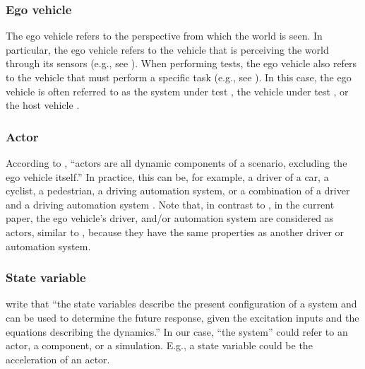 \subsubsection{Ego vehicle}
\label{sec:ego vehicle}
The ego vehicle refers to the perspective from which the world is seen. In particular, the ego vehicle refers to the vehicle that is perceiving the world through its sensors (e.g., see \autocite{Bonnin2014}). When performing tests, the ego vehicle also refers to the vehicle that must perform a specific task (e.g., see \autocite{althoff2017CommonRoad}). In this case, the ego vehicle is often referred to as the system under test \autocite{stellet2015taxonomy}, the vehicle under test \autocite{gietelink2006development}, or the host vehicle \autocite{gietelink2006development}.

\subsubsection{Actor}
\label{sec:actor}

According to \textcite{catapult2018musicc}, ``actors are all dynamic components of a scenario, excluding the ego vehicle itself.'' In practice, this can be, for example, a driver of a car, a cyclist, a pedestrian, a driving automation system, or a combination of a driver and a driving automation system \autocite{geyer2014}. Note that, in contrast to \autocite{catapult2018musicc}, in the current paper, the ego vehicle's driver, and/or automation system are considered as actors, similar to \autocite{geyer2014},  because they have the same properties as another driver or automation system.

 
\subsubsection{State variable} 
\label{sec:state variable}
\textcite[p.~163]{dorf2011modern} write that ``the state variables describe the present configuration of a system and can be used to determine the future response, given the excitation inputs and the equations describing the dynamics.'' In our case, ``the system'' could refer to an actor, a component, or a simulation. E.g., a state variable could be the acceleration of an actor.

